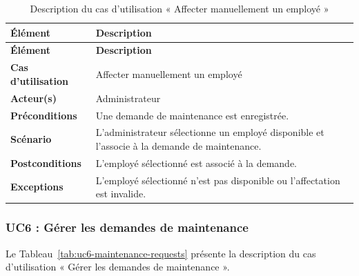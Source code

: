 \begin{longtable}{|>{\RaggedRight\arraybackslash}p{4cm}|>{\RaggedRight\arraybackslash}p{10.5cm}|}

\caption{Description du cas d'utilisation « Affecter manuellement un employé »}
\label{tab:uc5-manual-assignment}\\

\hline
\textbf{Élément} & \textbf{Description} \\
\hline
\endfirsthead

\hline
\textbf{Élément} & \textbf{Description} \\
\hline
\endhead

\textbf{Cas d'utilisation} &
Affecter manuellement un employé \\
\hline

\textbf{Acteur(s)} &
Administrateur \\
\hline

\textbf{Préconditions} &
Une demande de maintenance est enregistrée. \\
\hline

\textbf{Scénario} &
L'administrateur sélectionne un employé disponible et l'associe à la demande de maintenance. \\
\hline

\textbf{Postconditions} &
L'employé sélectionné est associé à la demande. \\
\hline

\textbf{Exceptions} &
L'employé sélectionné n'est pas disponible ou l'affectation est invalide. \\
\hline

\end{longtable}


\subsubsection{UC6 : Gérer les demandes de maintenance}

Le Tableau~\ref{tab:uc6-maintenance-requests} présente la description du cas d'utilisation « Gérer les demandes de maintenance ».

